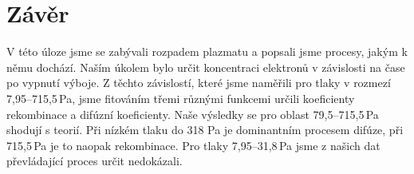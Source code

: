 \documentclass[a4paper,12pt]{article}
\begin{document}
\section{Závěr}
V této úloze jsme se zabývali rozpadem plazmatu a popsali jsme procesy, jakým k 
němu dochází. Naším úkolem bylo určit koncentraci elektronů v závislosti na 
čase po vypnutí výboje. Z těchto závislostí, které jsme naměřili pro 
tlaky v rozmezí 7,95--715,5\,Pa, jsme fitováním třemi různými funkcemi určili 
koeficienty rekombinace a difúzní koeficienty. Naše výsledky se pro oblast 
79,5--715,5\,Pa shodují s teorií. Při nízkém tlaku do 318 Pa je dominantním 
procesem difúze, při 715,5\,Pa je to naopak rekombinace. Pro tlaky 7,95--31,8\,Pa jsme 
z našich dat převládající proces určit nedokázali.
\end{document}
